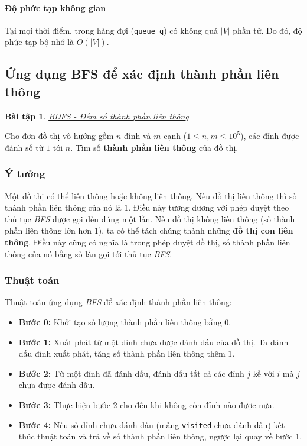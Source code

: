 \documentclass{article}
\newtheorem{baitap}{Bài tập}
\begin{document}
\paragraph{Độ phức tạp không gian}
Tại mọi thời điểm, trong hàng đợi (\texttt{queue q}) có không quá $|V|$ phần tử. Do đó, độ phức tạp bộ nhớ là $O(|V|)$.

\subsection{Ứng dụng BFS để xác định thành phần liên thông}

\begin{baitap}    
    \href{https://lequydon.ntucoder.net/Problem/Details/4601}{BDFS - Đếm số thành phần liên thông}
\end{baitap}
Cho đơn đồ thị vô hướng gồm $n$ đỉnh và $m$ cạnh ($1 \leq n, m \leq 10^5$), các đỉnh được đánh số từ $1$ tới $n$. Tìm số \textbf{thành phần liên thông} của đồ thị.

\subsubsection{Ý tưởng}

Một đồ thị có thể liên thông hoặc không liên thông. Nếu đồ thị liên thông thì số thành phần liên thông của nó là $1$. Điều này tương đương với phép duyệt theo thủ tục \textit{BFS} được gọi đến đúng một lần. Nếu đồ thị không liên thông (số thành phần liên thông lớn hơn $1$), ta có thể tách chúng thành những \textbf{đồ thị con liên thông}. Điều này cũng có nghĩa là trong phép duyệt đồ thị, số thành phần liên thông của nó bằng số lần gọi tới thủ tục \textit{BFS}.

\subsubsection{Thuật toán}

Thuật toán ứng dụng \textit{BFS} để xác định thành phần liên thông:

\begin{itemize}
    \item \textbf{Bước 0:} Khởi tạo số lượng thành phần liên thông bằng $0$.
    \item \textbf{Bước 1:} Xuất phát từ một đỉnh chưa được đánh dấu của đồ thị. Ta đánh dấu đỉnh xuất phát, tăng số thành phần liên thông thêm $1$.
    \item \textbf{Bước 2:} Từ một đỉnh đã đánh dấu, đánh dấu tất cả các đỉnh $j$ kề với $i$ mà $j$ chưa được đánh dấu.
    \item \textbf{Bước 3:} Thực hiện bước 2 cho đến khi không còn đỉnh nào được nữa.
    \item \textbf{Bước 4:} Nếu số đỉnh chưa đánh dấu (mảng \texttt{visited} chưa đánh dấu) kết thúc thuật toán và trả về số thành phần liên thông, ngược lại quay về bước 1.
\end{itemize}
\end{document}
